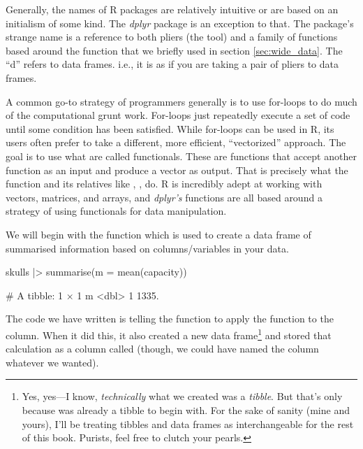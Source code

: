 \begin{mdframed}[nobreak = true, style = miscFrame, frametitle = \Large\IMFellEnglish Box 3.1: Why is it called \textit{dplyr}?]
\color{darkgray}
\IMFellEnglish

Generally, the names of R packages are relatively intuitive or are based on an initialism of some kind. The \textit{dplyr} package is an exception to that. The package's strange name is a reference to both pliers (the tool) and a family of functions based around the  function that we briefly used in section \ref{sec:wide_data}. The \enquote{d} refers to data frames. i.e., it is as if you are taking a pair of pliers to data frames.

A common go-to strategy of programmers generally is to use for-loops to do much of the computational grunt work. For-loops just repeatedly execute a set of code until some condition has been satisfied. While for-loops can be used in R, its users often prefer to take a different, more efficient, \enquote{vectorized} approach. The goal is to use what are called \glspl{functional}. These are functions that accept another function as an input and produce a vector as output. That is precisely what the  function and its relatives like , ,  do. R is incredibly adept at working with vectors, matrices, and arrays, and \textit{dplyr's} functions are all based around a strategy of using functionals for data manipulation.
\end{mdframed}

We will begin with the  function which is used to create a data frame of summarised information based on columns/variables in your data.

\begin{inR}
skulls |> 
  summarise(m = mean(capacity))
\end{inR}

\begin{outR}
# A tibble: 1 × 1
      m
  <dbl>
1 1335.
\end{outR}

The code we have written is telling the  function to apply the  function to the  column. When it did this, it also created a new data frame\footnote{Yes, yes—I know, \textit{technically} what we created was a \textit{tibble}. But that’s only because  was already a tibble to begin with. For the sake of sanity (mine and yours), I’ll be treating tibbles and data frames as interchangeable for the rest of this book. Purists, feel free to clutch your pearls.} and stored that calculation as a column called  (though, we could have named the column whatever we wanted).

